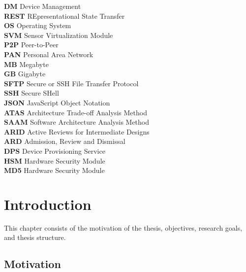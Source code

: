 \documentclass[12pt,a4paper]{article}
\newenvironment{sftabbing}[1][1]
  {\par\sffamily#1\tabbing}
  {\endtabbing}
\begin{document}
\begin{sftabbing}[\small]
\textbf{DM} \> Device Management\> \\
\textbf{REST} \> REpresentational State Transfer\> \\
\textbf{OS} \> Operating System\> \\
\textbf{SVM} \> Sensor Virtualization Module\> \\
\textbf{P2P} \> Peer-to-Peer\> \\
\textbf{PAN} \> Personal Area Network\> \\
\textbf{MB} \> Megabyte\> \\
\textbf{GB} \> Gigabyte\> \\
\textbf{SFTP} \> Secure or SSH File Transfer Protocol\> \\
\textbf{SSH} \> Secure SHell\> \\
\textbf{JSON} \> JavaScript Object Notation\> \\
\textbf{ATAS} \> Architecture Trade-off Analysis Method\> \\
\textbf{SAAM} \> Software Architecture Analysis Method\> \\
\textbf{ARID} \> Active Reviews for Intermediate Designs\> \\
\textbf{ARD} \> Admission, Review and Dismissal\> \\
\textbf{DPS} \> Device Provisioning Service\> \\
\textbf{HSM} \> Hardware Security Module\> \\
\textbf{MD5} \> Hardware Security Module\> \\

\end{sftabbing} 

\printglossary[type=\acronymtype]

\newpage

\listoffigures
\clearpage


\fancyfoot{}
\rfoot{\thepage}
\setcounter{page}{1}
\renewcommand{\baselinestretch}{1.5} %
\section{Introduction}

This chapter consists of the motivation of the thesis, objectives, research goals, and thesis structure.

\subsection{Motivation}
\end{document}

